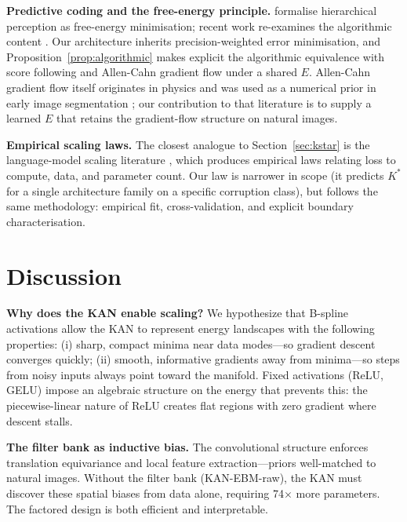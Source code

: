 \documentclass{article}
\begin{document}
\textbf{Predictive coding and the free-energy principle.}
\citet{rao1999predictive,friston2005free,bogacz2017tutorial}
formalise hierarchical perception as free-energy minimisation; recent work
re-examines the algorithmic content
\citep{millidge2022predictive,tschantz2023hybrid}. Our architecture inherits
precision-weighted error minimisation, and Proposition~\ref{prop:algorithmic}
makes explicit the algorithmic equivalence with score following and
Allen-Cahn gradient flow under a shared $E$. Allen-Cahn gradient flow
itself originates in physics
\citep{allen1979microscopic,fife1988dynamics} and was used as a numerical
prior in early image segmentation \citep{esedoglu2002threshold}; our
contribution to that literature is to supply a learned $E$ that retains the
gradient-flow structure on natural images.

\textbf{Empirical scaling laws.} The closest analogue to
Section~\ref{sec:kstar} is the language-model scaling literature
\citep{kaplan2020scaling,hoffmann2022chinchilla}, which produces empirical
laws relating loss to compute, data, and parameter count. Our law is
narrower in scope (it predicts $K^{*}$ for a single architecture family on
a specific corruption class), but follows the same methodology: empirical
fit, cross-validation, and explicit boundary characterisation.

\section{Discussion}

\textbf{Why does the KAN enable scaling?} We hypothesize that B-spline activations
allow the KAN to represent energy landscapes with the following properties: (i) sharp,
compact minima near data modes—so gradient descent converges quickly; (ii) smooth,
informative gradients away from minima—so steps from noisy inputs always point toward
the manifold. Fixed activations (ReLU, GELU) impose an algebraic structure on the
energy that prevents this: the piecewise-linear nature of ReLU creates flat regions
with zero gradient where descent stalls.

\textbf{The filter bank as inductive bias.} The convolutional structure enforces
translation equivariance and local feature extraction—priors well-matched to natural
images. Without the filter bank (KAN-EBM-raw), the KAN must discover these spatial
biases from data alone, requiring 74$\times$ more parameters. The factored design
is both efficient and interpretable.
\end{document}
